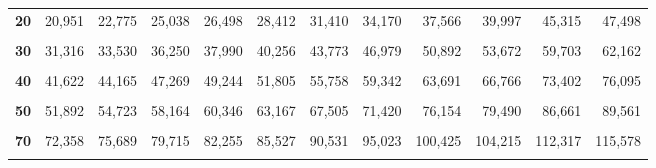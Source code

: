 \documentclass[
  11pt,
  ngerman,
  a4paper,
]{report}
\begin{document}
\begin{table}[H]
{\begin{tabular}{>{}r|rrrrrrrrrrr}
\textbf{20} & 20,951 & 22,775 & 25,038 & 26,498 & 28,412 & 31,410 & 34,170 & 37,566 & 39,997 & 45,315 & 47,498\\
\addlinespace
\textbf{\cellcolor{gray!6}{25}} & \cellcolor{gray!6}{26,143} & \cellcolor{gray!6}{28,172} & \cellcolor{gray!6}{30,675} & \cellcolor{gray!6}{32,282} & \cellcolor{gray!6}{34,382} & \cellcolor{gray!6}{37,652} & \cellcolor{gray!6}{40,646} & \cellcolor{gray!6}{44,314} & \cellcolor{gray!6}{46,928} & \cellcolor{gray!6}{52,620} & \cellcolor{gray!6}{54,947}\\
\textbf{30} & 31,316 & 33,530 & 36,250 & 37,990 & 40,256 & 43,773 & 46,979 & 50,892 & 53,672 & 59,703 & 62,162\\
\textbf{\cellcolor{gray!6}{35}} & \cellcolor{gray!6}{36,475} & \cellcolor{gray!6}{38,859} & \cellcolor{gray!6}{41,778} & \cellcolor{gray!6}{43,640} & \cellcolor{gray!6}{46,059} & \cellcolor{gray!6}{49,802} & \cellcolor{gray!6}{53,203} & \cellcolor{gray!6}{57,342} & \cellcolor{gray!6}{60,275} & \cellcolor{gray!6}{66,619} & \cellcolor{gray!6}{69,199}\\
\textbf{40} & 41,622 & 44,165 & 47,269 & 49,244 & 51,805 & 55,758 & 59,342 & 63,691 & 66,766 & 73,402 & 76,095\\
\textbf{\cellcolor{gray!6}{45}} & \cellcolor{gray!6}{46,761} & \cellcolor{gray!6}{49,452} & \cellcolor{gray!6}{52,729} & \cellcolor{gray!6}{54,810} & \cellcolor{gray!6}{57,505} & \cellcolor{gray!6}{61,656} & \cellcolor{gray!6}{65,410} & \cellcolor{gray!6}{69,957} & \cellcolor{gray!6}{73,166} & \cellcolor{gray!6}{80,077} & \cellcolor{gray!6}{82,876}\\
\addlinespace
\textbf{50} & 51,892 & 54,723 & 58,164 & 60,346 & 63,167 & 67,505 & 71,420 & 76,154 & 79,490 & 86,661 & 89,561\\
\textbf{\cellcolor{gray!6}{60}} & \cellcolor{gray!6}{62,135} & \cellcolor{gray!6}{65,227} & \cellcolor{gray!6}{68,972} & \cellcolor{gray!6}{71,341} & \cellcolor{gray!6}{74,397} & \cellcolor{gray!6}{79,082} & \cellcolor{gray!6}{83,298} & \cellcolor{gray!6}{88,379} & \cellcolor{gray!6}{91,952} & \cellcolor{gray!6}{99,607} & \cellcolor{gray!6}{102,695}\\
\textbf{70} & 72,358 & 75,689 & 79,715 & 82,255 & 85,527 & 90,531 & 95,023 & 100,425 & 104,215 & 112,317 & 115,578\\
\textbf{\cellcolor{gray!6}{80}} & \cellcolor{gray!6}{82,566} & \cellcolor{gray!6}{86,120} & \cellcolor{gray!6}{90,405} & \cellcolor{gray!6}{93,106} & \cellcolor{gray!6}{96,578} & \cellcolor{gray!6}{101,879} & \cellcolor{gray!6}{106,629} & \cellcolor{gray!6}{112,329} & \cellcolor{gray!6}{116,321} & \cellcolor{gray!6}{124,839} & \cellcolor{gray!6}{128,261}\\

\end{tabular}}
\end{table}
\end{document}
